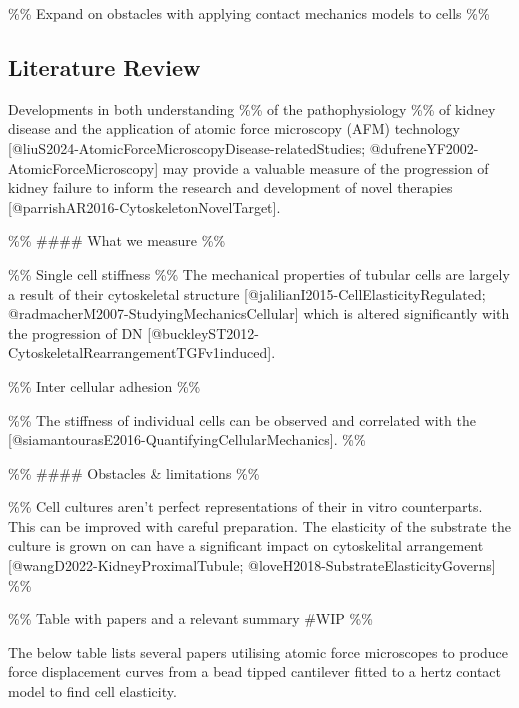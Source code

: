 \documentclass[
  paper=a4,
  ,captions=tableheading
]{scrartcl}
\begin{document}
\%\% Expand on obstacles with applying contact mechanics models to cells
\%\%

\subsection{Literature Review}\label{literature-review}

Developments in both understanding \%\% of the pathophysiology \%\% of
kidney disease and the application of atomic force microscopy (AFM)
technology {[}@liuS2024-AtomicForceMicroscopyDisease-relatedStudies;
@dufreneYF2002-AtomicForceMicroscopy{]} may provide a valuable measure
of the progression of kidney failure to inform the research and
development of novel therapies
{[}@parrishAR2016-CytoskeletonNovelTarget{]}.

\%\% \#\#\#\# What we measure \%\%

\%\% Single cell stiffness \%\% The mechanical properties of tubular
cells are largely a result of their cytoskeletal structure
{[}@jalilianI2015-CellElasticityRegulated;
@radmacherM2007-StudyingMechanicsCellular{]} which is altered
significantly with the progression of DN
{[}@buckleyST2012-CytoskeletalRearrangementTGFv1induced{]}.

\%\% Inter cellular adhesion \%\%

\%\% The stiffness of individual cells can be observed and correlated
with the {[}@siamantourasE2016-QuantifyingCellularMechanics{]}. \%\%

\%\% \#\#\#\# Obstacles \& limitations \%\%

\%\% Cell cultures aren't perfect representations of their in vitro
counterparts. This can be improved with careful preparation. The
elasticity of the substrate the culture is grown on can have a
significant impact on cytoskelital arrangement
{[}@wangD2022-KidneyProximalTubule;
@loveH2018-SubstrateElasticityGoverns{]} \%\%

\%\% Table with papers and a relevant summary \#WIP \%\%

The below table lists several papers utilising atomic force microscopes
to produce force displacement curves from a bead tipped cantilever
fitted to a hertz contact model to find cell elasticity.
\end{document}
